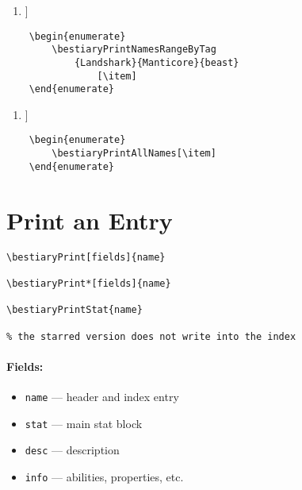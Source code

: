 \documentclass[itdr]{subfiles}
\begin{document}
\begin{enumerate}
	[\item]
\end{enumerate}

\vfill

\begin{lstlisting}
	\begin{enumerate}
		\bestiaryPrintNamesRangeByTag
			{Landshark}{Manticore}{beast}
				[\item]
	\end{enumerate}
\end{lstlisting}

\begin{enumerate}
	[\item]
\end{enumerate}

\vfill
\break

\begin{lstlisting}
	\begin{enumerate}
		\bestiaryPrintAllNames[\item]
	\end{enumerate}
\end{lstlisting}

\begin{enumerate}
	\bestiaryPrintAllNames[\item]
\end{enumerate}

\vfill
\break

\section{Print an Entry}

\begin{lstlisting}
\bestiaryPrint[fields]{name}

\bestiaryPrint*[fields]{name}

\bestiaryPrintStat{name}

% the starred version does not write into the index
\end{lstlisting}

\paragraph{Fields:}
\begin{itemize}
	\item \lstinline!name! --- header and index entry
	\item \lstinline!stat! --- main stat block
	\item \lstinline!desc! --- description
	\item \lstinline!info! --- abilities, properties, etc.
\end{itemize}
\end{document}

